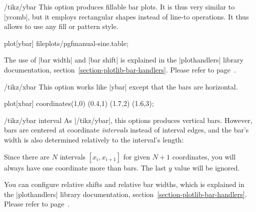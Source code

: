 \begin{key}{/tikz/ybar}
    This option produces fillable bar plots. It is thus very similar to
    |ycomb|, but it employs rectangular shapes instead of line-to operations.
    It thus allows to use any fill or pattern style.
\begin{codeexample}[]
\tikz\draw[draw=blue,fill=blue!60!black] plot[ybar] file{plots/pgfmanual-sine.table};
\end{codeexample}

\begin{codeexample}[]
\end{codeexample}
    The use of |bar width| and |bar shift| is explained in the |plothandlers|
    library documentation, section~\ref{section-plotlib-bar-handlers}. Please
    refer to page~\pageref{key-bar-width}.
\end{key}

\begin{key}{/tikz/xbar}
    This option works like |ybar| except that the bars are horizontal.
\begin{codeexample}[preamble={\usetikzlibrary{patterns}}]
\tikz \draw[pattern=north west lines] plot[xbar]
   coordinates{(1,0) (0.4,1) (1.7,2) (1.6,3)};
\end{codeexample}
\end{key}

\begin{key}{/tikz/ybar interval}
    As |/tikz/ybar|, this options produces vertical bars. However, bars are
    centered at coordinate \emph{intervals} instead of interval edges, and the
    bar's width is also determined relatively to the interval's length:
\begin{codeexample}[]
\end{codeexample}
    Since there are $N$ intervals $[x_i,x_{i+1}]$ for given $N+1$ coordinates,
    you will always have one coordinate more than bars. The last $y$ value will
    be ignored.

    You can configure relative shifts and relative bar widths, which is
    explained in the |plothandlers| library documentation,
    section~\ref{section-plotlib-bar-handlers}. Please refer to
    page~\pageref{key-bar-interval-width}.
\end{key}

